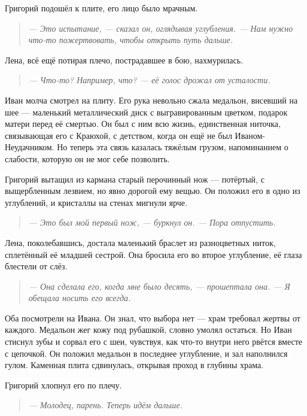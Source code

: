 \documentclass[12pt,a4paper]{book}
\newenvironment{dialogue}{\begin{quote}\itshape}{\end{quote}} %
\begin{document}
Григорий подошёл к плите, его лицо было мрачным.

\begin{dialogue}
--- Это испытание, --- сказал он, оглядывая углубления. --- Нам нужно что-то пожертвовать, чтобы открыть путь дальше.
\end{dialogue}

Лена, всё ещё потирая плечо, пострадавшее в бою, нахмурилась.

\begin{dialogue}
--- Что-то? Например, что? --- её голос дрожал от усталости.
\end{dialogue}

Иван молча смотрел на плиту. Его рука невольно сжала медальон, висевший на шее --- маленький металлический диск с выгравированным цветком, подарок матери перед её смертью. Он был с ним всю жизнь, единственная ниточка, связывающая его с Краюхой, с детством, когда он ещё не был Иваном-Неудачником. Но теперь эта связь казалась тяжёлым грузом, напоминанием о слабости, которую он не мог себе позволить.

Григорий вытащил из кармана старый перочинный нож --- потёртый, с выщербленным лезвием, но явно дорогой ему вещью. Он положил его в одно из углублений, и кристаллы на стенах мигнули ярче.

\begin{dialogue}
--- Это был мой первый нож, --- буркнул он. --- Пора отпустить.
\end{dialogue}

Лена, поколебавшись, достала маленький браслет из разноцветных ниток, сплетённый её младшей сестрой. Она бросила его во второе углубление, её глаза блестели от слёз.

\begin{dialogue}
--- Она сделала его, когда мне было десять, --- прошептала она. --- Я обещала носить его всегда.
\end{dialogue}

Оба посмотрели на Ивана. Он знал, что выбора нет --- храм требовал жертвы от каждого. Медальон жег кожу под рубашкой, словно умолял остаться. Но Иван стиснул зубы и сорвал его с шеи, чувствуя, как что-то внутри него рвётся вместе с цепочкой. Он положил медальон в последнее углубление, и зал наполнился гулом. Каменная плита сдвинулась, открывая проход в глубины храма.

Григорий хлопнул его по плечу.

\begin{dialogue}
--- Молодец, парень. Теперь идём дальше.
\end{dialogue}
\end{document}

